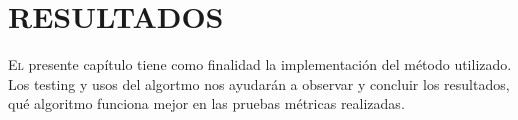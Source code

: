 \doublespacing
\chapter{RESULTADOS}

\lettrine[lines=4, slope=0.2em, findent=0.2em, nindent=0.6em]{E}{l}  presente capítulo tiene como finalidad la implementación del método utilizado. Los testing y usos del algortmo nos ayudarán a observar y concluir los resultados, qué algoritmo funciona mejor en las pruebas métricas realizadas.   










